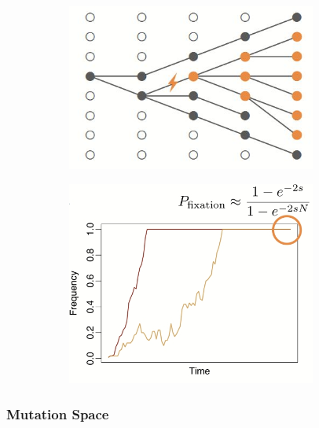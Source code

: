 \documentclass[]{article}
\begin{document}
\begin{figure}[H]
	\caption{The fate of mutations with fitness
		consequences}\label{fig:Selection}
	\begin{subfigure}[t]{0.4\textwidth}
		\includegraphics[width=0.9\textwidth]{Mutation2}
	\end{subfigure}
	\begin{subfigure}[t]{0.55\textwidth}
		\includegraphics[width=0.9\textwidth]{Selection}
	\end{subfigure}
\end{figure}

\subsubsection{Mutation Space}
\end{document}
